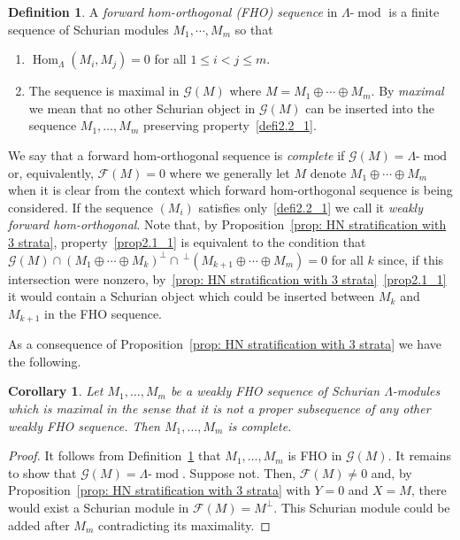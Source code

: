 \documentclass[10pt]{amsart}
\newtheorem{coro}[theo]{Corollary}
\theoremstyle{definition}
\newtheorem{defi}[theo]{Definition}
\DeclareMathOperator{\Hom}{Hom}%
\DeclareMathOperator{\modr}{mod}
\newcommand{\cF}{\ensuremath{{\mathcal{F}}}}
\newcommand{\cG}{\ensuremath{{\mathcal{G}}}}
\begin{document}
\begin{defi}\label{def of FHO}
A \emph{forward hom-orthogonal (FHO) sequence} in $\Lambda\text{-}\modr$ is a finite sequence of Schurian modules $M_1, \cdots, M_m$ so that
\begin{enumerate}
\item\label{defi2.2_1} $\Hom_\Lambda(M_i,M_j)=0$ for all $1\le i<j\le m$.
\item\label{defi2.2_2} The sequence is maximal in $\cG(M)$ where $M=M_1\oplus \cdots\oplus M_m$. By \emph{maximal} we mean that no other Schurian object in $\cG(M)$ can be inserted into the sequence $M_1,\ldots,M_m$ preserving property~\eqref{defi2.2_1}.
\end{enumerate}
We say that a forward hom-orthogonal sequence is \emph{complete} if $\cG(M)=\Lambda\text{-}\modr$ or, equivalently, $\cF(M)=0$ where we generally let $M$ denote $M_1\oplus\cdots\oplus M_m$ when it is clear from the context which forward hom-orthogonal sequence is being considered. If the sequence $(M_i)$ satisfies only~\eqref{defi2.2_1} we call it \emph{weakly forward hom-orthogonal}. Note that, by Proposition~\ref{prop: HN stratification with 3 strata}, property~\eqref{prop2.1_1} is equivalent to the condition that $\cG(M)\cap(M_1\oplus \cdots \oplus M_k)^\perp\cap\,^\perp(M_{k+1}\oplus\cdots\oplus M_m)=0$ for all $k$ since, if this intersection were nonzero, by~\ref{prop: HN stratification with 3 strata}~\eqref{prop2.1_1} it would contain a Schurian object which could be inserted between $M_k$ and $M_{k+1}$ in the FHO sequence.
\end{defi}

As a consequence of Proposition~\ref{prop: HN stratification with 3 strata} we have the following.


\begin{coro}\label{cor: max weakly forward hom-orth is complete}
Let $M_1,\ldots,M_m$ be a weakly FHO sequence of Schurian $\Lambda$-modules which is \emph{maximal} in the sense that it is not a proper subsequence of any other weakly FHO sequence. Then $M_1,\ldots,M_m$ is complete.
\end{coro}

\begin{proof}
It follows from Definition~\ref{def of FHO} that $M_1,\ldots,M_m$ is FHO in $\cG(M)$. It remains to show that $\cG(M)=\Lambda\text{-}\modr $. Suppose not. Then, $\cF(M)\neq0$ and, by Proposition~\ref{prop: HN stratification with 3 strata} with $Y=0$ and $X=M$, there would exist a Schurian module in $\cF(M)=M^\perp$. This Schurian module could be added after $M_m$ contradicting its maximality.
\end{proof}
\end{document}
